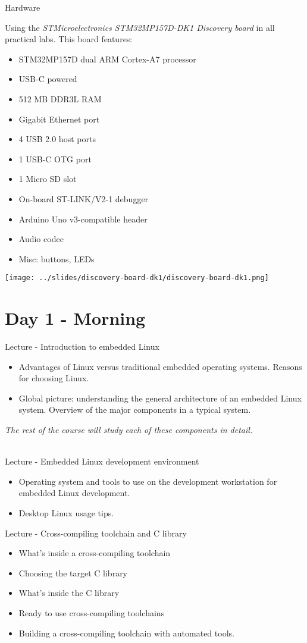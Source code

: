 \documentclass[a4paper,12pt,obeyspaces,spaces,hyphens]{article}
\begin{document}
\feagendatwocolumn
{Hardware}
{
  Using the {\em STMicroelectronics STM32MP157D-DK1 Discovery board} in all
  practical labs. This board features:

  \begin{itemize}
  \item STM32MP157D dual ARM Cortex-A7 processor
  \item USB-C powered
  \item 512 MB DDR3L RAM
  \item Gigabit Ethernet port
  \item 4 USB 2.0 host ports
  \item 1 USB-C OTG port
  \item 1 Micro SD slot
  \item On-board ST-LINK/V2-1 debugger
  \item Arduino Uno v3-compatible header
  \item Audio codec
  \item Misc: buttons, LEDs
  \end{itemize}
}
{}
{
  \begin{center}
    \texttt{[image: ../slides/discovery-board-dk1/discovery-board-dk1.png]}
  \end{center}
}

\section{Day 1 - Morning}

\feagendaonecolumn
{Lecture - Introduction to embedded Linux}
{
  \begin{itemize}
  \item Advantages of Linux versus traditional embedded operating systems.
        Reasons for choosing Linux.
  \item Global picture: understanding the general architecture of an
        embedded Linux system. Overview of the major components in a typical
        system.
  \end{itemize}
  {\em The rest of the course will study each of these components in detail.}
}
\\
\feagendatwocolumn
{Lecture - Embedded Linux development environment}
{
  \begin{itemize}
  \item Operating system and tools to use on the development
        workstation for embedded Linux development.
  \item Desktop Linux usage tips.
  \end{itemize}
}
{Lecture - Cross-compiling toolchain and C library}
{
  \begin{itemize}
  \item What's inside a cross-compiling toolchain
  \item Choosing the target C library
  \item What's inside the C library
  \item Ready to use cross-compiling toolchains
  \item Building a cross-compiling toolchain with automated tools.
  \end{itemize}
}
\end{document}
